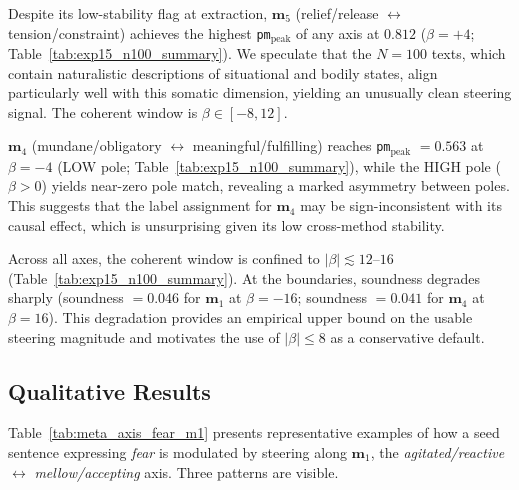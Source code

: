 Despite its low-stability flag at extraction, $\mathbf{m}_5$ (relief/release $\leftrightarrow$ tension/constraint) achieves the highest \texttt{pm}$_\text{peak}$ of any axis at $0.812$ ($\beta=+4$; Table~\ref{tab:exp15_n100_summary}). We speculate that the $N=100$ texts, which contain naturalistic descriptions of situational and bodily states, align particularly well with this somatic dimension, yielding an unusually clean steering signal. The coherent window is $\beta \in [-8, 12]$.\par

$\mathbf{m}_4$ (mundane/obligatory $\leftrightarrow$ meaningful/fulfilling) reaches \texttt{pm}$_\text{peak}$ $= 0.563$ at $\beta=-4$ (LOW pole; Table~\ref{tab:exp15_n100_summary}), while the HIGH pole ($\beta > 0$) yields near-zero pole match, revealing a marked asymmetry between poles. This suggests that the label assignment for $\mathbf{m}_4$ may be sign-inconsistent with its causal effect, which is unsurprising given its low cross-method stability.\par

Across all axes, the coherent window is confined to $|\beta| \lesssim 12$--$16$ (Table~\ref{tab:exp15_n100_summary}). At the boundaries, soundness degrades sharply (soundness $= 0.046$ for $\mathbf{m}_1$ at $\beta=-16$; soundness $= 0.041$ for $\mathbf{m}_4$ at $\beta=16$). This degradation provides an empirical upper bound on the usable steering magnitude and motivates the use of $|\beta| \leq 8$ as a conservative default.\par


\subsection{Qualitative Results}
\label{sec:ch2-meta-axis-qualitative}

Table~\ref{tab:meta_axis_fear_m1} presents representative examples of how a seed sentence expressing \textit{fear} is modulated by steering along $\mathbf{m}_1$, the \textit{agitated/reactive} $\leftrightarrow$ \textit{mellow/accepting} axis. Three patterns are visible.\par

